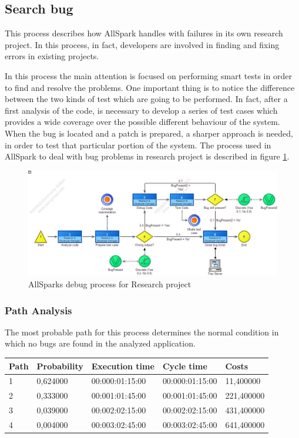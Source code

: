 \subsection{Search bug}
This process describes how AllSpark handles with failures in its own
research project. In this process, in fact, developers are involved in
finding and fixing errors in existing projects.

In this process the main attention is focused on performing smart tests in
order to find and resolve the problems. One important thing is to notice
the difference between the two kinds of test which are going to be
performed.
In fact, after a first analysis of the code, is necessary to develop a
series of test cases which provides a wide coverage over the possible
different behaviour of the system. When the bug is located and a patch is
prepared, a sharper approach is needed, in order to test that particular
portion of the system. The process used in AllSpark to deal with bug
problems in research project is described in figure \ref{2img:search_bug}.

\begin{figure}[!ht]
\begin{centering}
\includegraphics[scale=0.50, angle=90]{assign2/adonis/imgs/debug.jpg}
\caption{AllSparks debug process for Research project}
\label{2img:search_bug}
\end{centering}
\end{figure}

\subsubsection{Path Analysis}
The most probable path for this process determines the normal condition in
which no bugs are found in the analyzed application.
\begin{table}[ht!]
\centering
\begin{tabular}{|l|l|l|l|l|}
\hline
Path&Probability&Execution time&Cycle time&Costs\\
\hline
1&0,624000&00:000:01:15:00&00:000:01:15:00&11,400000\\
\hline
2&0,333000&00:001:01:45:00&00:001:01:45:00&221,400000\\
\hline
3&0,039000&00:002:02:15:00&00:002:02:15:00&431,400000\\
\hline
4&0,004000&00:003:02:45:00&00:003:02:45:00&641,400000\\
\hline
\end{tabular}
\end{table}

